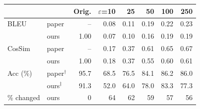 \begin{tabular}{llrrrrrr}
\toprule
 & & Orig. & $\varepsilon$=10 & 25 & 50 & 100 & 250 \\
\midrule
BLEU & paper & -- & 0.08 & 0.11 & 0.19 & 0.22 & 0.23 \\
 & ours & 1.00 & 0.07 & 0.10 & 0.16 & 0.19 & 0.19 \\
CosSim & paper & -- & 0.17 & 0.37 & 0.61 & 0.65 & 0.67 \\
 & ours & 1.00 & 0.18 & 0.37 & 0.55 & 0.60 & 0.61 \\
Acc (\%) & paper$^\dagger$ & 95.7 & 68.5 & 76.5 & 84.1 & 86.2 & 86.0 \\
 & ours$^\ddagger$ & 91.3 & 52.0 & 64.0 & 78.0 & 83.3 & 77.3 \\
\% changed & ours & 0 & 64 & 62 & 59 & 57 & 56 \\
\bottomrule
\end{tabular}
